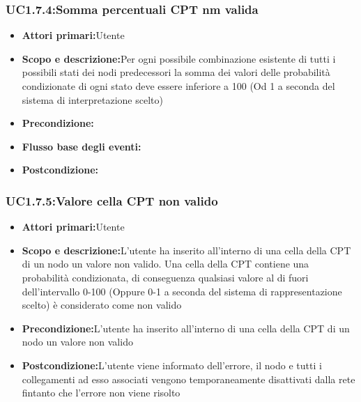 \subsubsection{UC1.7.4:Somma percentuali CPT nm valida}
\begin{itemize}
	\item{\textbf{Attori primari:}Utente}
	\item{\textbf{Scopo e descrizione:}Per ogni possibile combinazione esistente di tutti i possibili stati dei nodi predecessori la somma dei valori delle probabilità condizionate di ogni stato deve essere inferiore a 100 (Od 1 a seconda del sistema di interpretazione scelto)}
	\item{\textbf{Precondizione:}}
	\item{\textbf{Flusso base degli eventi:}}
	\item{\textbf{Postcondizione:}}
\end{itemize}
\subsubsection{UC1.7.5:Valore cella CPT non valido}
\begin{itemize}
	\item{\textbf{Attori primari:}Utente}
	\item{\textbf{Scopo e descrizione:}L'utente ha inserito all'interno di una cella della CPT di un nodo un valore non valido. Una cella della CPT contiene una probabilità condizionata, di conseguenza qualsiasi valore al di fuori dell'intervallo 0-100 (Oppure 0-1 a seconda del sistema di rappresentazione scelto) è considerato come non valido}
	\item{\textbf{Precondizione:}L'utente ha inserito all'interno di una cella della CPT di un nodo un valore non valido}
	\item{\textbf{Postcondizione:}L'utente viene informato dell'errore, il nodo e tutti i collegamenti ad esso associati vengono temporaneamente disattivati dalla rete fintanto che l'errore non viene risolto}
\end{itemize}
